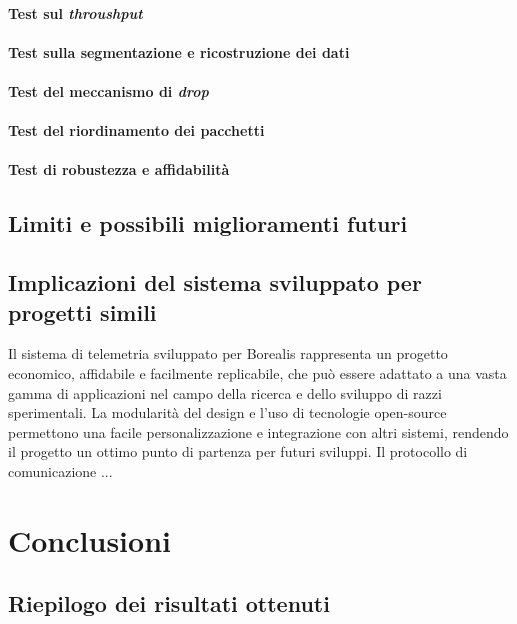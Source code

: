 \documentclass[12pt,a4paper,twoside]{book}
\begin{document}
\subsubsection{Test sul \emph{throushput}}
\subsubsection{Test sulla segmentazione e ricostruzione dei dati}
\subsubsection{Test del meccanismo di \emph{drop}}
\subsubsection{Test del riordinamento dei pacchetti}
\subsubsection{Test di robustezza e affidabilità}

\section{Limiti e possibili miglioramenti futuri}

\section{Implicazioni del sistema sviluppato per progetti simili}
Il sistema di telemetria sviluppato per Borealis rappresenta un progetto economico, 
affidabile e facilmente replicabile, che può essere adattato a una vasta gamma di applicazioni
nel campo della ricerca e dello sviluppo di razzi sperimentali.
La modularità del design e l'uso di tecnologie open-source permettono una facile
personalizzazione e integrazione con altri sistemi, rendendo il progetto un
ottimo punto di partenza per futuri sviluppi.
Il protocollo di comunicazione ... 

\chapter{Conclusioni} \label{chap:conclusion}

\section{Riepilogo dei risultati ottenuti}
\end{document}
